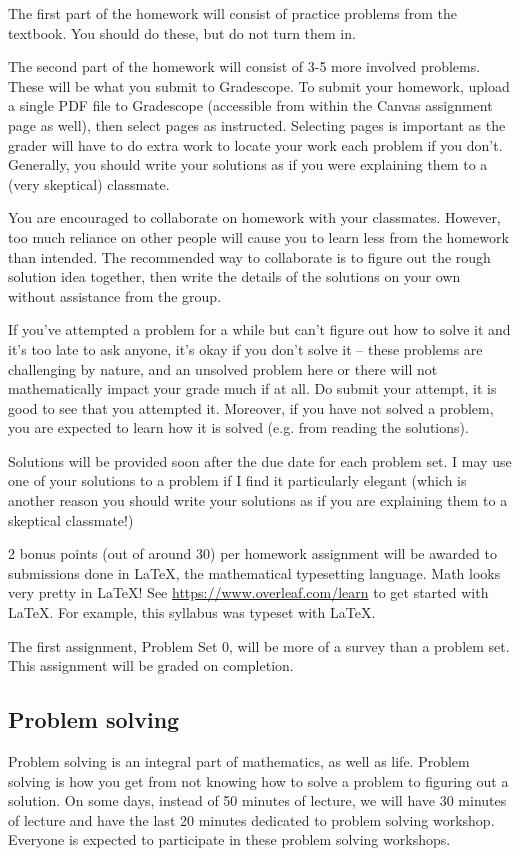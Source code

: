 \documentclass[11pt,oneside]{amsart}
\begin{document}
The first part of the homework will consist of practice problems from the textbook. You should do these, but do not turn them in.

The second part of the homework will consist of 3-5 more involved problems. These will be what you submit to Gradescope. To submit your homework, upload a single PDF file to Gradescope (accessible from within the Canvas assignment page as well), then select pages as instructed. Selecting pages is important as the grader will have to do extra work to locate your work each problem if you don't. Generally, you should write your solutions as if you were explaining them to a (very skeptical) classmate.

You are encouraged to collaborate on homework with your classmates. However, too much reliance on other people will cause you to learn less from the homework than intended. The recommended way to collaborate is to figure out the rough solution idea together, then write the details of the solutions on your own without assistance from the group.

If you've attempted a problem for a while but can't figure out how to solve it and it's too late to ask anyone, it's okay if you don't solve it -- these problems are challenging by nature, and an unsolved problem here or there will not mathematically impact your grade much if at all. Do submit your attempt, it is good to see that you attempted it. Moreover, if you have not solved a problem, you are expected to learn how it is solved (e.g. from reading the solutions).

Solutions will be provided soon after the due date for each problem set. I may use one of your solutions to a problem if I find it particularly elegant (which is another reason you should write your solutions as if you are explaining them to a skeptical classmate!)

2 bonus points (out of around 30) per homework assignment will be awarded to submissions done in \LaTeX, the mathematical typesetting language. Math looks very pretty in \LaTeX! See \url{https://www.overleaf.com/learn} to get started with \LaTeX. For example, this syllabus was typeset with \LaTeX.

The first assignment, Problem Set 0, will be more of a survey than a problem set. This assignment will be graded on completion.

\subsection*{Problem solving}
Problem solving is an integral part of mathematics, as well as life. Problem solving is how you get from not knowing how to solve a problem to figuring out a solution. On some days, instead of 50 minutes of lecture, we will have 30 minutes of lecture and have the last 20 minutes dedicated to problem solving workshop. Everyone is expected to participate in these problem solving workshops.
\end{document}
